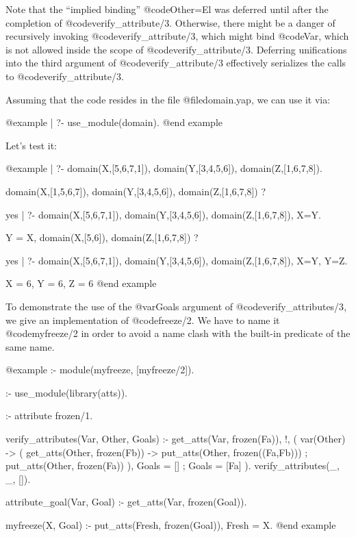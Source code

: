{{{{{{{{{Note that the ``implied binding'' @code{Other=El} was deferred until after
the completion of @code{verify_attribute/3}.  Otherwise, there might be a
danger of recursively invoking @code{verify_attribute/3}, which might bind
@code{Var}, which is not allowed inside the scope of @code{verify_attribute/3}.
Deferring unifications into the third argument of @code{verify_attribute/3}
effectively serializes the calls to @code{verify_attribute/3}.

Assuming that the code resides in the file @file{domain.yap}, we
can use it via:

@example
| ?- use_module(domain).
@end example

Let's test it:

@example
| ?- domain(X,[5,6,7,1]), domain(Y,[3,4,5,6]), domain(Z,[1,6,7,8]).

domain(X,[1,5,6,7]),
domain(Y,[3,4,5,6]),
domain(Z,[1,6,7,8]) ? 

yes
| ?- domain(X,[5,6,7,1]), domain(Y,[3,4,5,6]), domain(Z,[1,6,7,8]), 
     X=Y.

Y = X,
domain(X,[5,6]),
domain(Z,[1,6,7,8]) ? 

yes
| ?- domain(X,[5,6,7,1]), domain(Y,[3,4,5,6]), domain(Z,[1,6,7,8]),
     X=Y, Y=Z.

X = 6,
Y = 6,
Z = 6
@end example

To demonstrate the use of the @var{Goals} argument of
@code{verify_attributes/3}, we give an implementation of
@code{freeze/2}.  We have to name it @code{myfreeze/2} in order to
avoid a name clash with the built-in predicate of the same name.

@example
:- module(myfreeze, [myfreeze/2]).

:- use_module(library(atts)).

:- attribute frozen/1.

verify_attributes(Var, Other, Goals) :-
        get_atts(Var, frozen(Fa)), !,       %
        (   var(Other) ->                   %
            (   get_atts(Other, frozen(Fb)) %
            ->  put_atts(Other, frozen((Fa,Fb))) %
            ;   put_atts(Other, frozen(Fa)) %
            ),
            Goals = []
        ;   Goals = [Fa]
        ).
verify_attributes(_, _, []).

attribute_goal(Var, Goal) :-                %
        get_atts(Var, frozen(Goal)).

myfreeze(X, Goal) :-
        put_atts(Fresh, frozen(Goal)),
        Fresh = X.
@end example

}}}}}}}}}
